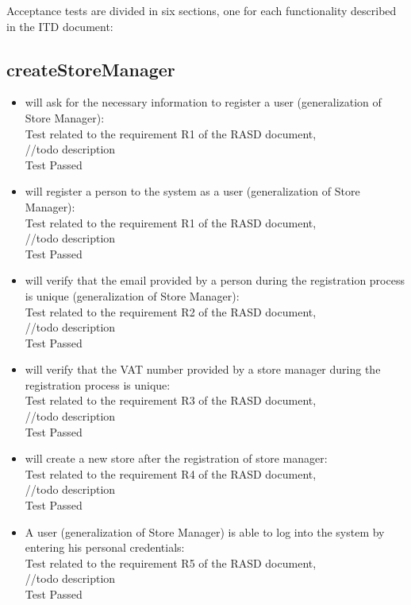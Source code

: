 Acceptance tests are divided in six sections, one for each functionality described in the ITD document:

\subsection{createStoreManager}

\begin{itemize}
    \item will ask for the necessary information to register a user (generalization of Store Manager): \\
    Test related to the requirement R1 of the RASD document, \\
    //todo description \\
    Test Passed \\

    \item will register a person to the system as a user (generalization of Store Manager): \\
    Test related to the requirement R1 of the RASD document, \\
    //todo description\\
    Test Passed\\

    \item will verify that the email provided by a person during the registration process is unique (generalization of Store Manager): \\
    Test related to the requirement R2 of the RASD document, \\
    //todo description \\
    Test Passed \\

    \item will verify that the VAT number provided by a store manager during the registration process is unique: \\
    Test related to the requirement R3 of the RASD document, \\
    //todo description \\
    Test Passed \\

    \item will create a new store after the registration of store manager: \\
    Test related to the requirement R4 of the RASD document, \\
    //todo description \\
    Test Passed \\

    \item A user (generalization of Store Manager) is able to log into the system by entering his personal credentials: \\
    Test related to the requirement R5 of the RASD document, \\
    //todo description \\
    Test Passed \\

\end{itemize}
